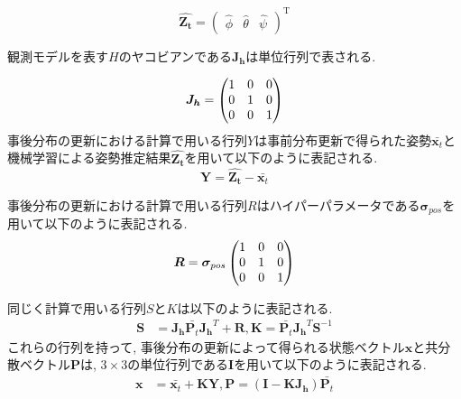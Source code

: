 \begin{equation}
	\hat{\bm{Z_{t}}}
	=
	\begin{pmatrix}
		\hat{\phi} & \hat{\theta} & \hat{\psi}
	\end{pmatrix}
	^\mathrm{T}
\end{equation}

観測モデルを表す$H$のヤコビアンである\(\bm{J_h}\)は単位行列で表される.

\begin{equation}
	\begin{split}
		\bm{J_h}
		= \begin{pmatrix}
			1 & 0 & 0 \cr
			0 & 1 & 0 \cr
                0 & 0 & 1
		 \end{pmatrix}
	\end{split}
\end{equation}
事後分布の更新における計算で用いる行列$Y$は事前分布更新で得られた姿勢$\bar{\bm{x}_{t}}$と機械学習による姿勢推定結果$\hat{\bm{Z_{t}}}$を用いて以下のように表記される.
\begin{equation}
    \bm{Y} = \hat{\bm{Z_{t}}} - \bar{\bm{x}_{t}}
\end{equation}

事後分布の更新における計算で用いる行列$R$はハイパーパラメータである$\bm{\sigma}_{pos}$を用いて以下のように表記される.
\begin{equation}
	\begin{split}
		\bm{R}
		= \bm{\sigma}_{pos}
		\begin{pmatrix}
			1 & 0 & 0 \cr
			0 & 1 & 0 \cr
                0 & 0 & 1
		 \end{pmatrix}
	\end{split}
\end{equation}\label{eq:sigma_pos}

同じく計算で用いる行列$S$と$K$は以下のように表記される.
\begin{equation}
	\begin{split}
		\bm{S}
		&=
		\bm{J_h}\bar{\bm{P}_{t}}\bm{J_h}^{T} + \bm{R}
		, %
		\bm{K}
		=\bar{\bm{P}_{t}}\bm{J_h}^{T}\bm{S}^{-1}
	\end{split}
\end{equation}
これらの行列を持って, 事後分布の更新によって得られる状態ベクトル\(\bm{x}\)と共分散ベクトル\(\bm{P}\)は, $3 \times 3$の単位行列である\(\bm{I}\)を用いて以下のように表記される.
\begin{equation}
	\begin{split}
		\bm{x}
		&=
		\bar{\bm{x}_{t}} + \bm{K}\bm{Y}
		, %
		\bm{P}
		=(\bm{I} - \bm{K}\bm{J_h})\bar{\bm{P}_{t}}
	\end{split}
\end{equation}